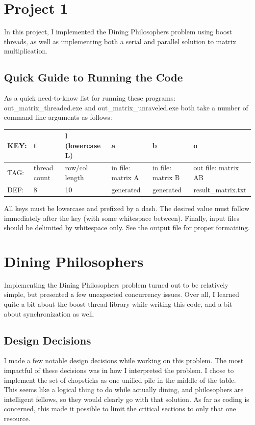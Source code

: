 \documentclass[letterpaper,10pt,titlepage]{article}
\begin{document}

\section{Project 1}
In this project, I implemented the Dining Philosophers problem using boost threads,
as well as implementing both a serial and parallel solution to matrix multiplication.

\subsection{Quick Guide to Running the Code}

As a quick need-to-know list for running these programs: out\_matrix\_threaded.exe and
out\_matrix\_unraveled.exe both take a number of command line arguments as follows:

\vfill

\begin{tabular}{ | p{0.3in} | p{0.8in} | p{1in} | p{1in} | p{1in} | p{1.2in} | }
	\hline
	KEY: & t & l (lowercase L) & a & b & o \\ \hline
	TAG: & thread count & row/col length & in file: matrix A & in file: matrix B & out file: matrix AB \\ \hline
	DEF: & 8 & 10 & generated & generated & result\_matrix.txt \\ \hline
\end{tabular}

\vfill
\noindent
All keys must be lowercase and prefixed by a dash. The desired value must follow immediately
after the key (with some whitespace between). Finally, input files should be delimited by 
whitespace only. See the output file for proper formatting. 

\section{Dining Philosophers}
Implementing the Dining Philosophers problem turned out to be relatively simple,
but presented a few unexpected concurrency issues. Over all, I learned quite a bit about
the boost thread library while writing this code, and a bit about synchronization as well. 

\subsection{Design Decisions}
I made a few notable design decisions while working on this problem. The most impactful 
of these decisions was in how I interpreted the problem. I chose to implement the set of 
chopsticks as one unified pile in the middle of the table. This seems like a logical
thing to do while actually dining, and philosophers are intelligent fellows, so they
would clearly go with that solution. As far as coding is concerned, this made it possible
to limit the critical sections to only that one resource.
\end{document}
